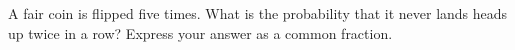 A fair coin is flipped five times. What is the probability that it never lands heads up twice in a row? Express your answer as a common fraction.
